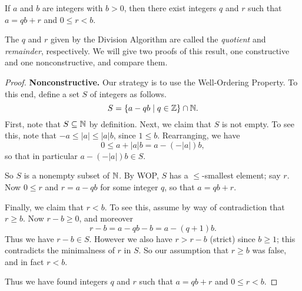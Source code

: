 \begin{thm}
If \(a\) and \(b\) are integers with \(b > 0\), then there exist integers \(q\) and \(r\) such that \(a = qb + r\) and \(0 \leq r < b\).
\end{thm}

The \(q\) and \(r\) given by the Division Algorithm are called the \emph{quotient} and \emph{remainder}, respectively. We will give two proofs of this result, one constructive and one nonconstructive, and compare them.

\begin{proof}
\textbf{Nonconstructive.} Our strategy is to use the Well-Ordering Property. To this end, define a set \(S\) of integers as follows. \[ S = \{ a - qb \mid q \in \mathbb{Z} \} \cap \mathbb{N}. \] First, note that \(S \subseteq \mathbb{N}\) by definition. Next, we claim that \(S\) is not empty. To see this, note that \(-a \leq |a| \leq |a|b\), since \(1 \leq b\). Rearranging, we have \[ 0 \leq a + |a|b = a - (-|a|)b, \] so that in particular \(a - (-|a|)b \in S\).

So \(S\) is a nonempty subset of \(\mathbb{N}\). By WOP, \(S\) has a \(\leq\)-smallest element; say \(r\). Now \(0 \leq r\) and \(r = a - qb\) for some integer \(q\), so that \(a = qb + r\).

Finally, we claim that \(r < b\). To see this, assume by way of contradiction that \(r \geq b\). Now \(r-b \geq 0\), and moreover \[ r-b = a - qb - b = a - (q+1)b. \] Thus we have \(r-b \in S\). However we also have \(r > r-b\) (strict) since \(b \geq 1\); this contradicts the minimalness of \(r\) in \(S\). So our assumption that \(r \geq b\) was false, and in fact \(r < b\).

Thus we have found integers \(q\) and \(r\) such that \(a = qb + r\) and \(0 \leq r < b\).
\end{proof}

